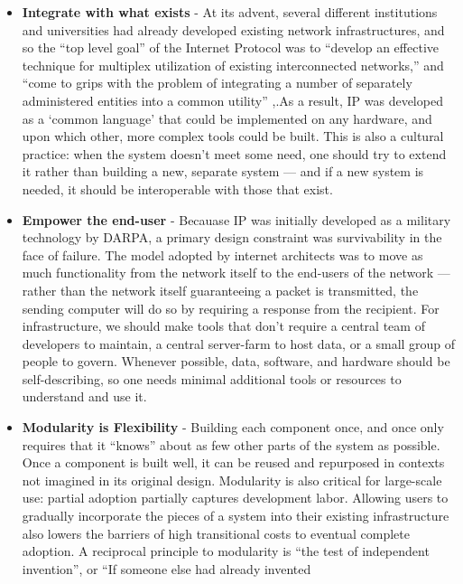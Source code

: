 \documentclass[nohyper]{tufte-book-jls}
\begin{document}
\begin{itemize}

\item
  \textbf{Integrate with what exists} - At its advent, several different
  institutions and universities had already developed existing network
  infrastructures, and so the ``top level goal'' of the Internet
  Protocol was to ``develop an effective technique for multiplex
  utilization of existing interconnected networks,'' and ``come to grips
  with the problem of integrating a number of separately administered
  entities into a common utility'' \cite{clarkDesignPhilosophyDARPA1988},.As a result, IP was developed as
  a `common language' that could be implemented on any hardware, and
  upon which other, more complex tools could be built. This is also a
  cultural practice: when the system doesn't meet some need, one should
  try to extend it rather than building a new, separate system --- and
  if a new system is needed, it should be interoperable with those that
  exist.
\item
  \textbf{Empower the end-user} - Becauase IP was initially developed as
  a military technology by DARPA, a primary design constraint was
  survivability in the face of failure. The model adopted by internet
  architects was to move as much functionality from the network itself
  to the end-users of the network --- rather than the network itself
  guaranteeing a packet is transmitted, the sending computer will do so
  by requiring a response from the recipient. For infrastructure, we
  should make tools that don't require a central team of developers to
  maintain, a central server-farm to host data, or a small group of
  people to govern. Whenever possible, data, software, and hardware
  should be self-describing, so one needs minimal additional tools or
  resources to understand and use it.
\item
  \textbf{Modularity is Flexibility} - Building each component once, and
  once only requires that it ``knows'' about as few other parts of the
  system as possible. Once a component is built well, it can be reused
  and repurposed in contexts not imagined in its original design.
  Modularity is also critical for large-scale use: partial adoption
  partially captures development labor. Allowing users to gradually
  incorporate the pieces of a system into their existing infrastructure
  also lowers the barriers of high transitional costs to eventual
  complete adoption. A reciprocal principle to modularity is ``the test
  of independent invention'', or ``If someone else had already invented

\end{itemize}
\end{document}
